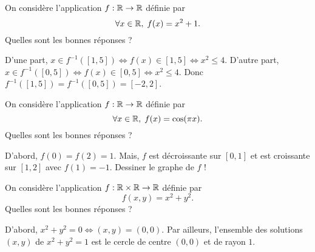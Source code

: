 \begin{question}
On considère l'application $f:\mathbb{R}\to \mathbb{R}$ définie par
$$\forall x\in \mathbb{R},\; f(x)=x^2+1.$$
Quelles sont les bonnes réponses ?
\begin{answers}  
\end{answers}
\begin{explanations}
D'une part, $x\in f^{-1}([1,5])\Leftrightarrow f(x)\in [1,5]\Leftrightarrow x^2\leq 4$. D'autre part, $x\in f^{-1}([0,5])\Leftrightarrow f(x)\in [0,5]\Leftrightarrow x^2\leq 4$. Donc $f^{-1}([1,5])=f^{-1}([0,5])=[-2,2]$.
\end{explanations}
\end{question}


\begin{question}
On considère l'application $f:\mathbb{R}\to \mathbb{R}$ définie par
$$\forall x\in \mathbb{R},\; f(x)=\cos (\pi x).$$
Quelles sont les bonnes réponses ?
\begin{answers}  
\end{answers}
\begin{explanations}
D'abord, $f(0)=f(2)=1$. Mais, $f$ est décroissante sur $[0,1]$ et est croissante sur $[1,2]$ avec $f(1)=-1$. Dessiner le graphe de $f$ !
\end{explanations}
\end{question}


\begin{question}
On considère l'application $f:\mathbb{R}\times \mathbb{R}\to \mathbb{R}$ définie par
$$f(x,y)=x^2+y^2.$$
Quelles sont les bonnes réponses ?
\begin{answers}  
\end{answers}
\begin{explanations}
D'abord, $x^2+y^2=0\Leftrightarrow (x,y)=(0,0)$. Par ailleurs, l'ensemble des solutions $(x,y)$ de $x^2+y^2=1$ est le cercle de centre $(0,0)$ et de rayon $1$.
\end{explanations}
\end{question}



